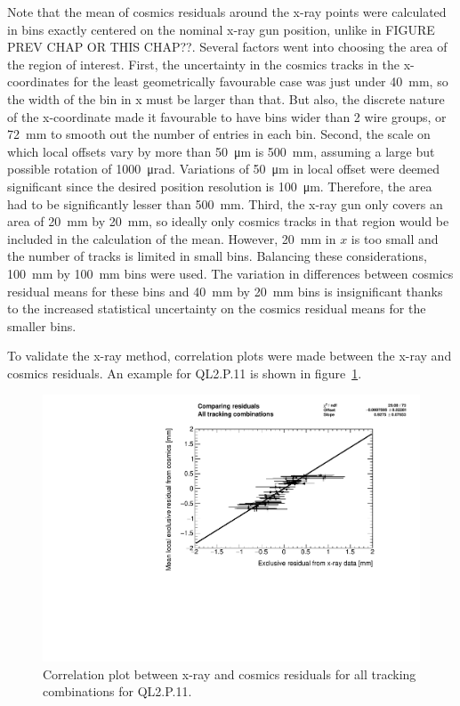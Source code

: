 Note that the mean of cosmics residuals around the x-ray points were calculated in bins exactly centered on the nominal x-ray gun position, unlike in FIGURE PREV CHAP OR THIS CHAP??. Several factors went into choosing the area of the region of interest. First, the uncertainty in the cosmics tracks in the x-coordinates for the least geometrically favourable case was just under \SI{40}{\milli\meter}, so the width of the bin in x must be larger than that. But also, the discrete nature of the x-coordinate made it favourable to have bins wider than 2 wire groups, or \SI{72}{\milli\meter} to smooth out the number of entries in each bin. Second, the scale on which local offsets vary by more than \SI{50}{\micro\meter} is \SI{500}{\milli\meter}, assuming a large but possible rotation of \SI{1000}{\micro\radian}. Variations of \SI{50}{\micro\meter} in local offset were deemed significant since the desired position resolution is \SI{100}{\micro\meter}. Therefore, the area had to be significantly lesser than \SI{500}{\milli\meter}. Third, the x-ray gun only covers an area of \SI{20}{\milli\meter} by \SI{20}{\milli\meter}, so ideally only cosmics tracks in that region would be included in the calculation of the mean. However, \SI{20}{\milli\meter} in $x$ is too small and the number of tracks is limited in small bins. Balancing these considerations, \SI{100}{\milli\meter} by \SI{100}{\milli\meter} bins were used. The variation in differences between cosmics residual means for these bins and \SI{40}{\milli\meter} by \SI{20}{\milli\meter} bins is insignificant thanks to the increased statistical uncertainty on the cosmics residual means for the smaller bins.

To  validate the x-ray method, correlation plots were made between the x-ray and cosmics residuals. An example for QL2.P.11 is shown in figure~\ref{fig:correlation}.

\begin{figure}
    \centering
    \includegraphics[width = \textwidth]{figures/QL2P11_3100V_2021-08-05_local_mean_cosmics_residual_vs_xray_residual_scatter_all.pdf}
    \caption{Correlation plot between x-ray and cosmics residuals for all tracking combinations for QL2.P.11.}
    \label{fig:correlation}
\end{figure}

